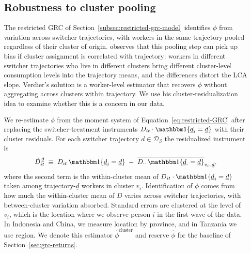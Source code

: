 \documentclass[12pt]{article}
\begin{document}

\subsection{Robustness to cluster pooling}\label{subsec:verdier-robustness}

The restricted GRC of Section~\ref{subsec:restricted-grc-model} identifies $\phi$ from variation across switcher trajectories, with workers in the same trajectory pooled regardless of their cluster of origin.
\citet{verdierAverageTreatmentEffects2020a} observes that this pooling step can pick up bias if cluster assignment is correlated with trajectory: workers in different switcher trajectories who live in different clusters bring different cluster-level consumption levels into the trajectory means, and the differences distort the LCA slope.
Verdier's solution is a worker-level estimator that recovers $\phi$ without aggregating across clusters within trajectory.
We use his cluster-residualization idea to examine whether this is a concern in our data.

We re-estimate $\phi$ from the moment system of Equation~\eqref{eq:restricted-GRC} after replacing the switcher-treatment instruments $D_{it}\cdot\mathbbm 1\{\underline d_i = \underline d\}$ with their cluster residuals.
For each switcher trajectory $\underline d \in \mathcal D_S$ the residualized instrument is
\begin{equation}\label{eq:residualized-instrument}
\tilde D_{it}^{\,\underline d} \;\equiv\; D_{it}\,\mathbbm 1\{\underline d_i=\underline d\} \;-\; \overline{D_{\cdot\cdot}\,\mathbbm 1\{\underline d_{\cdot}=\underline d\}}_{v_i,\,\underline d},
\end{equation}
where the second term is the within-cluster mean of $D_{it}\cdot\mathbbm 1\{\underline d_i=\underline d\}$ taken among trajectory-$\underline d$ workers in cluster $v_i$.
Identification of $\phi$ comes from how much the within-cluster mean of $D$ varies across switcher trajectories, with between-cluster variation absorbed.
Standard errors are clustered at the level of $v_i$, which is the location where we observe person $i$ in the first wave of the data.
In Indonesia and China, we measure location by province, and in Tanzania we use region.
We denote this estimator $\hat\phi^{\mathrm{cluster}}$ and reserve $\hat\phi$ for the baseline of Section~\ref{sec:grc-returns}.
\end{document}
